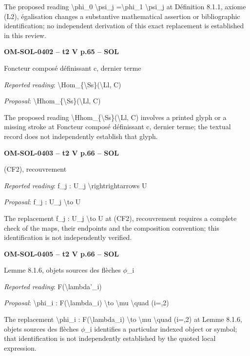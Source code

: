The proposed reading \textbackslash{}phi\_0 \textbackslash{}psi\_j =\allowbreak  \textbackslash{}phi\_1 \textbackslash{}psi\_j at Définition 8.1.1, axiome (L2), égalisation changes a substantive mathematical assertion or bibliographic identification; no independent derivation of this exact replacement is established in this review.\par
\par\noindent\textbf{OM-SOL-0402 -- t2 V p.65 -- SOL}\par
Foncteur composé définissant c, dernier terme\par
\emph{Reported reading}: \textbackslash{}Hom\_\{\textbackslash{}Ss\}(\textbackslash{}Ll, C)\par
\emph{Proposal}: \textbackslash{}Hhom\_\{\textbackslash{}Ss\}(\textbackslash{}Ll, C)\par
The proposed reading \textbackslash{}Hhom\_\{\textbackslash{}Ss\}(\textbackslash{}Ll, C) involves a printed glyph or a missing stroke at Foncteur composé définissant c, dernier terme; the textual record does not independently establish that glyph.\par
\par\noindent\textbf{OM-SOL-0403 -- t2 V p.66 -- SOL}\par
(CF2), recouvrement\par
\emph{Reported reading}: f\_j : U\_j \textbackslash{}rightrightarrows U\par
\emph{Proposal}: f\_j : U\_j \textbackslash{}to U\par
The replacement f\_j : U\_j \textbackslash{}to U at (CF2), recouvrement requires a complete check of the maps, their endpoints and the composition convention; this identification is not independently verified.\par
\par\noindent\textbf{OM-SOL-0405 -- t2 V p.66 -- SOL}\par
Lemme 8.1.6, objets sources des flèches \ensuremath{\phi}\_i\par
\emph{Reported reading}: F(\textbackslash{}lambda'\_i)\par
\emph{Proposal}: \textbackslash{}phi\_i : F(\textbackslash{}lambda\_i) \textbackslash{}to \textbackslash{}mu \textbackslash{}quad (i=,2)\par
The replacement \textbackslash{}phi\_i : F(\textbackslash{}lambda\_i) \textbackslash{}to \textbackslash{}mu \textbackslash{}quad (i=,2) at Lemme 8.1.6, objets sources des flèches \ensuremath{\phi}\_i identifies a particular indexed object or symbol; that identification is not independently established by the quoted local expression.\par
